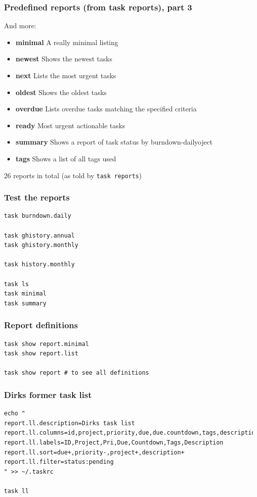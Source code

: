 \documentclass[t,handout]{beamer}
\begin{document}
\begin{frame}[fragile]\frametitle{Predefined reports (from task reports), part 3}
    And more:

    \begin{itemize}
        \item \textbf{minimal}          A really minimal listing
        \item \textbf{newest}           Shows the newest tasks
        \item \textbf{next}             Lists the most urgent tasks
        \item \textbf{oldest}           Shows the oldest tasks
        \item \textbf{overdue}          Lists overdue tasks matching the specified criteria
        \item \textbf{ready}            Most urgent actionable tasks
        \item \textbf{summary}          Shows a report of task status by burndown-dailyoject
        \item \textbf{tags}             Shows a list of all tags used
    \end{itemize}

    26 reports in total (as told by \verb=task reports=)
\end{frame}

\begin{frame}[fragile]\frametitle{Test the reports}
    \vfill
    \begin{lstlisting}
task burndown.daily

task ghistory.annual
task ghistory.monthly

task history.monthly

task ls
task minimal
task summary\end{lstlisting}
\end{frame}

\begin{frame}[fragile]\frametitle{Report definitions}
    \vfill
    \begin{lstlisting}
task show report.minimal
task show report.list

task show report # to see all definitions\end{lstlisting}
\end{frame}

\begin{frame}[fragile]\frametitle{Dirks former task list}
    \vfill
    \begin{lstlisting}
echo "
report.ll.description=Dirks task list
report.ll.columns=id,project,priority,due,due.countdown,tags,description
report.ll.labels=ID,Project,Pri,Due,Countdown,Tags,Description
report.ll.sort=due+,priority-,project+,description+
report.ll.filter=status:pending
" >> ~/.taskrc

task ll\end{lstlisting}
\end{frame}
\end{document}
